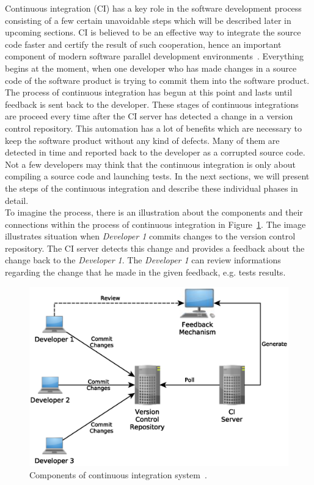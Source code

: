 Continuous integration (CI) has a key role in the software development process consisting of a few certain unavoidable steps which will be described later in upcoming sections. CI is believed to be an effective way to integrate the source code faster and certify the result of such cooperation, hence an important component of modern software parallel development environments~\cite{ResultsOfCIbuild}. Everything begins at the moment, when one developer who has made changes in a source code of the software product is trying to commit them into the software product. The process of continuous integration has begun at this point and lasts until feedback is sent back to the developer. These stages of continuous integrations are proceed every time after the CI server has detected a change in a version control repository. This automation has a lot of benefits which are necessary to keep the software product without any kind of defects. Many of them are detected in time and reported back to the developer as a corrupted source code. Not a few developers may think that the continuous integration is only about compiling a source code and launching tests. In the next sections, we will present the steps of the continuous integration and describe these individual phases in detail.\\

To imagine the process, there is an illustration about the components and their connections within the process of continuous integration in Figure~\ref{fig:cocis}. The image illustrates situation when \textit{Developer 1} commits changes to the version control repository. The CI server detects this change and provides a feedback about the change back to the \textit{Developer 1}. The \textit{Developer 1} can review informations regarding the change that he made in the given feedback, e.g. tests results.

\begin{figure}[H]
    \centering
    \includegraphics[scale=0.6]{yEd/components_of_CI_system.eps}
    \caption{Components of continuous integration system~\cite{CIbook}.}
    \label{fig:cocis}
\end{figure}

